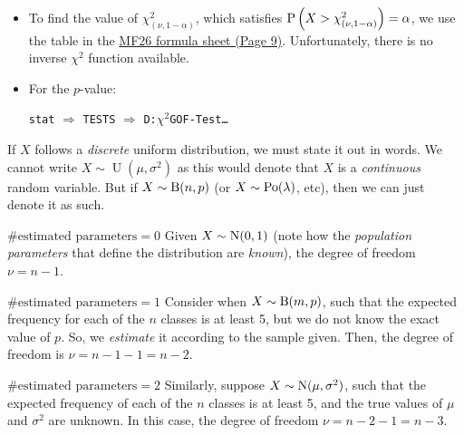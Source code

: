 \documentclass[../Notes.tex]{subfiles}
\begin{document}
\begin{GCSkills}{}
  \begin{itemize}
    \item To find the value of \(\chi^2_{(\nu,1-\alpha)}\), which satisfies \(\operatorname{P}\left(X>\chi^2_{(\nu,1-\alpha)}\right)=\alpha\), we use the table in the \href{https://www.seab.gov.sg/docs/default-source/national-examinations/syllabus/alevel/2022syllabus/List_MF26_y22_sy.pdf}{MF26 formula sheet (Page 9)}. Unfortunately, there is no inverse \(\chi^2\) function available.
    \item For the \(p\)-value:
    \begin{center}
      \texttt{stat} \(\Longrightarrow\) \texttt{TESTS} \(\Longrightarrow\) \texttt{D:\(\chi^2\)GOF-Test\dots}
    \end{center}
  \end{itemize}
\end{GCSkills}
\begin{note}
  If \(X\) follows a \emph{discrete} uniform distribution, we must state it out in words. We cannot write \(X\sim\operatorname{U}(\mu,\sigma^2)\) as this would denote that \(X\) is a \emph{continuous} random variable. But if \(X\sim\operatorname{B}(n,p)\) (or \(X\sim\operatorname{Po}(\lambda)\), etc), then we can just denote it as such. 
\end{note}
\begin{example}{\(\#\text{estimated parameters}=0\)}{}
  Given \(X\sim\operatorname{N}(0,1)\) (note how the \emph{population parameters} that define the distribution are \emph{known}), the degree of freedom \(\nu=n-1\).
\end{example}
\begin{example}{\(\#\text{estimated parameters}=1\)}{}
  Consider when \(X\sim\operatorname{B}(m,p)\), such that the expected frequency for each of the \(n\) classes is at least 5, but we do not know the exact value of \(p\). So, we \emph{estimate} it according to the sample given. Then, the degree of freedom is \(\nu=n-1-1=n-2\).
\end{example}
\begin{example}{\(\#\text{estimated parameters}=2\)}{}
  Similarly, suppose \(X\sim\operatorname{N}(\mu,\sigma^2)\), such that the expected frequency of each of the \(n\) classes is at least 5, and the true values of \(\mu\) and \(\sigma^2\) are unknown. In this case, the degree of freedom \(\nu=n-2-1=n-3\). 
\end{example}
\end{document}
